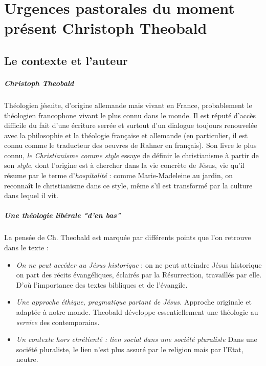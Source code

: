 \chapter{Urgences pastorales du moment présent Christoph Theobald }





\section{ Le contexte et l’auteur}

\paragraph{Christoph Theobald} Théologien jésuite, d'origine allemande mais vivant en France, probablement le théologien francophone vivant le plus connu dans le monde. Il est réputé d'accès difficile du fait d'une écriture serrée et surtout d'un dialogue toujours renouvelée avec la philosophie et la théologie française et allemande (en particulier, il est connu comme le traducteur des oeuvres de Rahner en français).  Son livre le plus connu, \textit{le Christianisme comme style} \cite{theobald_christianisme_2007} essaye de définir le christianisme à partir de son \textit{style}, dont l'origine est à chercher dans la vie concrète de Jésus, vie qu'il résume par le terme d'\textit{hospitalité} : comme Marie-Madeleine au jardin, on reconnaît le christianisme dans ce style, même s'il est transformé par la culture dans lequel il vit.


\paragraph{Une théologie libérale "d'en bas"} La pensée de Ch. Theobald est marquée par différents points que l'on retrouve dans le texte : 
\begin{itemize}
    \item \textit{On ne peut accéder au Jésus historique} : on ne peut atteindre Jésus historique  on part des récits évangéliques, éclairés par la Résurrection, travaillés par elle. D'où l'importance des textes bibliques et de l'évangile.
    \item  \textit{Une approche éthique, pragmatique partant de Jésus.}    Approche originale et adaptée à notre monde. Theobald développe essentiellement une  théologie au \textit{service} des contemporains. 
    \item \textit{Un contexte hors chrétienté : lien social dans une société pluraliste} Dans une société pluraliste,  le lien n'est plus assuré par le religion mais par l'Etat, neutre.
\end{itemize}
  
